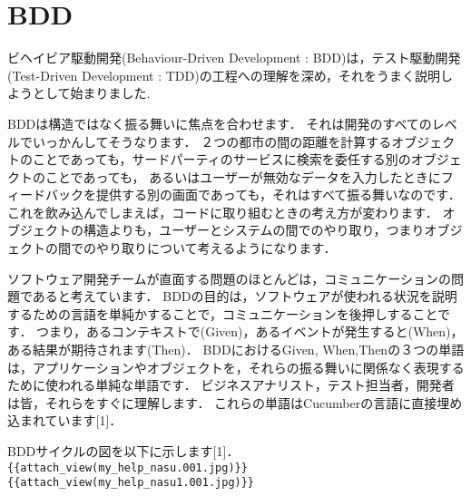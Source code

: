 \section{BDD}
ビヘイビア駆動開発(Behaviour-Driven Development : BDD)は，テスト駆動開発(Test-Driven Development : TDD)の工程への理解を深め，それをうまく説明しようとして始まりました.

BDDは構造ではなく振る舞いに焦点を合わせます．
それは開発のすべてのレベルでいっかんしてそうなります．
２つの都市の間の距離を計算するオブジェクトのことであっても，サードパーティのサービスに検索を委任する別のオブジェクトのことであっても，
あるいはユーザーが無効なデータを入力したときにフィードバックを提供する別の画面であっても，それはすべて振る舞いなのです．
これを飲み込んでしまえば，コードに取り組むときの考え方が変わります．
オブジェクトの構造よりも，ユーザーとシステムの間でのやり取り，つまりオブジェクトの間でのやり取りについて考えるようになります．

ソフトウェア開発チームが直面する問題のほとんどは，コミュニケーションの問題であると考えています．
BDDの目的は，ソフトウェアが使われる状況を説明するための言語を単純かすることで，コミュニケーションを後押しすることです．
つまり，あるコンテキストで(Given)，あるイベントが発生すると(When)，ある結果が期待されます(Then)．
BDDにおけるGiven, When,Thenの３つの単語は，アプリケーションやオブジェクトを，それらの振る舞いに関係なく表現するために使われる単純な単語です．
ビジネスアナリスト，テスト担当者，開発者は皆，それらをすぐに理解します．
これらの単語はCucumberの言語に直接埋め込まれています[1]．

BDDサイクルの図を以下に示します[1]．
\verb|{{attach_view(my_help_nasu.001.jpg)}}|
\verb|{{attach_view(my_help_nasu1.001.jpg)}}|

